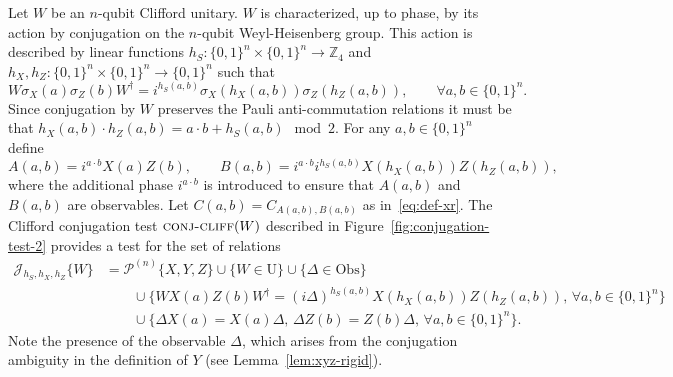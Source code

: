 \documentclass[11pt]{article}
\theoremstyle{remark}
\theoremstyle{definition}
\newcommand{\Z}{\ensuremath{\mathbb{Z}}}
\newcommand{\setft}[1]{\mathrm{#1}}
\newcommand{\Obs}{\setft{Obs}}
\newcommand{\Unitary}{\setft{U}}
\newcommand{\conjc}{\textsc{conj-cliff}}
\newcommand{\conjr}{\mathcal{J}\!}
\newcommand{\paulin}{\mathcal{P}^{(n)}\!}
\begin{document}
Let $W$ be an $n$-qubit Clifford unitary. $W$ is characterized, up to phase, by its action by conjugation on the $n$-qubit Weyl-Heisenberg group. This action is described  by linear functions $h_S:\{0,1\}^n\times\{0,1\}^n \to \Z_4$ and $h_X,h_Z:\{0,1\}^n\times\{0,1\}^n \to \{0,1\}^n$ such that
\begin{equation}\label{eq:conj-cliff}
W \sigma_X(a)\sigma_Z(b) W^\dagger = i^{h_S(a,b)}\sigma_X(h_X(a,b))\sigma_Z(h_Z(a,b)),\qquad\forall a,b\in\{0,1\}^n.
\end{equation}
Since conjugation by $W$ preserves the Pauli anti-commutation relations it must be that $h_X(a,b)\cdot h_Z(a,b) = a\cdot b+h_S(a,b)\mod 2$.
 For any $a,b\in\{0,1\}^n$ define
\begin{equation}\label{eq:def-control-c}
A(a,b) = i^{a\cdot b}X(a)Z(b), \qquad B(a,b) = i^{a\cdot b}i^{h_S(a,b)}X(h_X(a,b))Z(h_Z(a,b)),
\end{equation}
where the additional phase $i^{a\cdot b}$ is introduced to ensure that $A(a,b)$ and $B(a,b)$ are observables. Let $C(a,b)=C_{A(a,b),B(a,b)}$ as in~\eqref{eq:def-xr}. 
The Clifford conjugation test $\conjc(W)$ described in Figure~\ref{fig:conjugation-test-2} provides a test for the set of relations 
\begin{align*}
\conjr_{h_S,h_X,h_Z}\{W\} &= \paulin\{X,Y,Z\}  \cup \{W\in \Unitary\} \cup \{\Delta\in\Obs\}\\
&\qquad \cup \big\{ W X(a)Z(b)W^\dagger = (i\Delta)^{h_S(a,b)}X(h_X(a,b))Z(h_Z(a,b)),\,\forall a,b\in\{0,1\}^n\big\} \\
&\qquad \cup \big\{ \Delta X(a) = X(a)\Delta,\,\Delta Z(b)=Z(b)\Delta,\,\forall a,b\in\{0,1\}^n\big\}.
\end{align*}
Note the presence of the observable $\Delta$, which arises from the conjugation ambiguity in the definition of $Y$ (see Lemma~\ref{lem:xyz-rigid}). 
 
\end{document}
